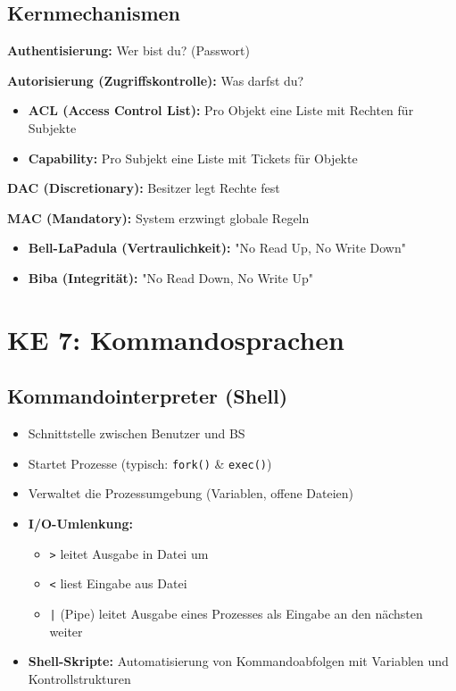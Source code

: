 \documentclass[9pt,a4paper]{extarticle}
\begin{document}
\begin{multicols*}{2}
\subsection{Kernmechanismen}
\textbf{Authentisierung:} Wer bist du? (Passwort)

\textbf{Autorisierung (Zugriffskontrolle):} Was darfst du?
\begin{itemize}
\item \textbf{ACL (Access Control List):} Pro Objekt eine Liste mit Rechten für Subjekte
\item \textbf{Capability:} Pro Subjekt eine Liste mit Tickets für Objekte
\end{itemize}

\textbf{DAC (Discretionary):} Besitzer legt Rechte fest

\textbf{MAC (Mandatory):} System erzwingt globale Regeln
\begin{itemize}
\item \textbf{Bell-LaPadula (Vertraulichkeit):} "No Read Up, No Write Down"
\item \textbf{Biba (Integrität):} "No Read Down, No Write Up"
\end{itemize}

\section{KE 7: Kommandosprachen}

\subsection{Kommandointerpreter (Shell)}
\begin{itemize}
\item Schnittstelle zwischen Benutzer und BS
\item Startet Prozesse (typisch: \texttt{fork()} \& \texttt{exec()})
\item Verwaltet die Prozessumgebung (Variablen, offene Dateien)
\item \textbf{I/O-Umlenkung:}
  \begin{itemize}
  \item \texttt{>} leitet Ausgabe in Datei um
  \item \texttt{<} liest Eingabe aus Datei
  \item \texttt{|} (Pipe) leitet Ausgabe eines Prozesses als Eingabe an den nächsten weiter
  \end{itemize}
\item \textbf{Shell-Skripte:} Automatisierung von Kommandoabfolgen mit Variablen und Kontrollstrukturen
\end{itemize}

\end{multicols*}
\end{document}
